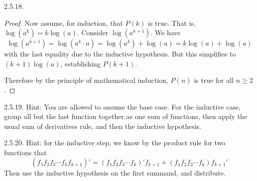 \begin {itemize}
\begin{ans}{2.5.18.}
\begin{proof}
			Now assume, for induction, that $P(k)$ is true.  That is, $\log(a^k) = k\log(a)$.  Consider $\log(a^{k+1})$.  We have
			\[\log(a^{k+1}) = \log(a^k\cdot a) = \log(a^k) + \log(a) = k\log(a) + \log(a)\]
			with the last equality due to the inductive hypothesis.  But this simplifies to $(k+1) \log(a)$, establishing $P(k+1)$.

			Therefore by the principle of mathematical induction, $P(n)$ is true for all $n \ge 2$.
		\end{proof}
	
\end{ans}
\begin{ans}{2.5.19.}
		Hint: You are allowed to assume the base case.  For the inductive case, group all but the last function together as one sum of functions, then apply the usual sum of derivatives rule, and then the inductive hypothesis.
	
\end{ans}
\begin{ans}{2.5.20.}
		Hint: for the inductive step, we know by the product rule for two functions that \[(f_1f_2f_3 \cdots f_k f_{k+1})' = (f_1f_2f_3\cdots f_k)'f_{k+1} + (f_1f_2f_3\cdots f_k)f_{k+1}'\]
		Then use the inductive hypothesis on the first summand, and distribute.
	
\end{ans}
\protect \end {itemize}
